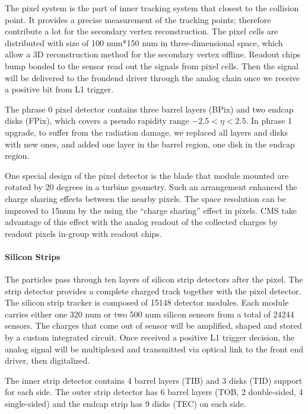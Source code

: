 The pixel system is the part of inner tracking system that closest to the collision point. It provides a precise measurement of the tracking points; therefore contribute a lot for the secondary vertex reconstruction. The pixel cells are distributed with size of 100 num*150 num in three-dimensional space, which allow a 3D reconstruction method for the secondary vertex offline. Readout chips bump bonded to the sensor read out the signals from pixel cells. Then the signal will be delivered to the frondend driver through the analog chain once we receive a positive bit from L1 trigger.

The phrase 0 pixel detector contains three barrel layers (BPix) and two endcap disks (FPix), which covers a pseudo rapidity range $-2.5<\eta<2.5$. In phrase 1 upgrade, to suffer from the radiation damage, we replaced all layers and disks with new ones, and added one layer in the barrel region, one disk in the endcap region.

One special design of the pixel detector is the blade that module mounted are rotated by 20 degrees in a turbine geometry. Such an arrangement enhanced the charge sharing effects between the nearby pixels. The space resolution can be improved to 15num by the using the “charge sharing” effect in pixels. CMS take advantage of this effect with the analog readout of the collected charges by readout pixels in-group with readout chips. 

\paragraph{Silicon Strips}

The particles pass through ten layers of silicon strip detectors after the pixel. The strip detector provides a complete charged track together with the pixel detector. The silicon strip tracker is composed of 15148 detector modules. Each module carries either one 320 num or two 500 num silicon sensors from a total of 24244 sensors. The charges that come out of sensor will be amplified, shaped and stored by a custom integrated circuit. Once received a positive L1 trigger decision, the analog signal will be multiplexed and transmitted via optical link to the front end driver, then digitalized. 

The inner strip detector contains 4 barrel layers (TIB) and 3 disks (TID) support for each side. The outer strip detector has 6 barrel layers (TOB, 2 double-sided, 4 single-sided) and the endcap strip has 9 disks (TEC) on each side.

